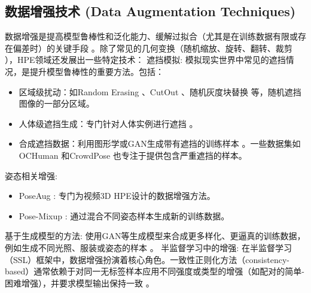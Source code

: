 \documentclass[12pt,a4paper]{article}
\begin{document}
\subsection{数据增强技术 (Data Augmentation Techniques)}
数据增强是提高模型鲁棒性和泛化能力、缓解过拟合（尤其是在训练数据有限或存在偏差时）的关键手段 \cite{Zhou2016HumanPoseSurvey}。除了常见的几何变换（随机缩放、旋转、翻转、裁剪 \cite{Xiao2018SimpleBaselines}），HPE领域还发展出一些特定技术：
遮挡模拟: 模拟现实世界中常见的遮挡情况，是提升模型鲁棒性的重要方法。包括：
\begin{itemize}
    \item 区域级扰动：如Random Erasing \cite{DeVries2017Cutout}、CutOut \cite{DeVries2017Cutout}、随机灰度块替换 \cite{DeVries2017Cutout} 等，随机遮挡图像的一部分区域。
    \item 人体级遮挡生成：专门针对人体实例进行遮挡 \cite{DeVries2017Cutout}。
    \item 合成遮挡数据：利用图形学或GAN生成带有遮挡的训练样本 \cite{Zhang2018PoseResNet}。一些数据集如OCHuman \cite{Zhang2019OCHuman} 和CrowdPose \cite{Li2019CrowdPose} 也专注于提供包含严重遮挡的样本。
\end{itemize}
姿态相关增强:
\begin{itemize}
    \item PoseAug \cite{Gong2021PoseAug}: 专门为视频3D HPE设计的数据增强方法。 %
    \item Pose-Mixup \cite{Cheng2020PoseMix}: 通过混合不同姿态样本生成新的训练数据。
\end{itemize}
基于生成模型的方法: 使用GAN等生成模型来合成更多样化、更逼真的训练数据，例如生成不同光照、服装或姿态的样本 \cite{Zhang2018PoseResNet}。 %
半监督学习中的增强: 在半监督学习（SSL）框架中，数据增强扮演着核心角色。一致性正则化方法（consistency-based）通常依赖于对同一无标签样本应用不同强度或类型的增强（如配对的简单-困难增强），并要求模型输出保持一致 \cite{Rasmus2015LadderNetworks}。
\end{document}
